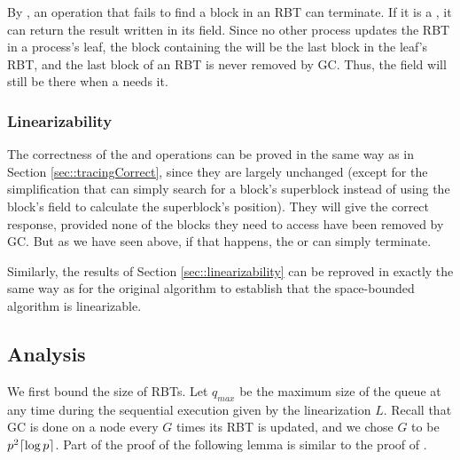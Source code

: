 By , an operation that fails to find a block in an RBT can terminate.
If it is a , it can return the result written in its  field.
Since no other process updates the RBT in a process's leaf, the block containing the 
will be the last block in the leaf's RBT, and the last block of an RBT is never removed by GC.
Thus, the  field will still be there when a  needs it.

\subsubsection{Linearizability}

The correctness of the  and   operations
can be proved in the same way as in Section \ref{sec::tracingCorrect},
since they are largely unchanged (except for the simplification that 
can simply search for a block's superblock instead of using the block's  
field to calculate the superblock's position).
They will give the correct response, provided none of the blocks they need to access have been 
removed by GC.  But as we have seen above, if that happens, the  or  can simply terminate.

Similarly, the results of Section \ref{sec::linearizability} 
can be reproved in exactly the same way as for the original algorithm to establish
that the space-bounded algorithm is linearizable.

\subsection{Analysis}
\label{sec::GCanalysis}


We first bound the size of RBTs.  Let $q_{max}$ be the maximum size of the queue at any time during the sequential execution given by the linearization $L$.
Recall that GC is done on a node every $G$ times its RBT is updated, and we chose $G$ to be $p^2\lceil \log p \rceil$.
Part of the proof of the following lemma is similar to the proof of .

